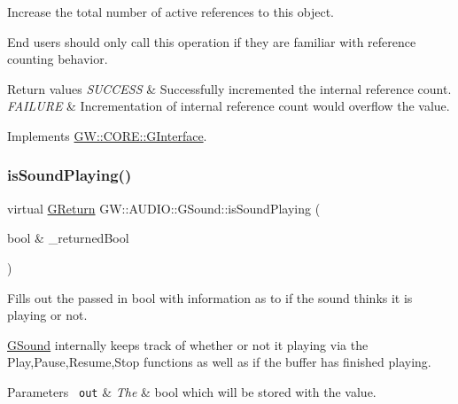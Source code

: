 Increase the total number of active references to this object. 

End users should only call this operation if they are familiar with reference counting behavior.


\begin{DoxyRetVals}{Return values}
{\em S\+U\+C\+C\+E\+SS} & Successfully incremented the internal reference count. \\
\hline
{\em F\+A\+I\+L\+U\+RE} & Incrementation of internal reference count would overflow the value. \\
\hline
\end{DoxyRetVals}


Implements \mbox{\hyperlink{classGW_1_1CORE_1_1GInterface_a2d710f20bb78e544e8309b5b75c21260}{G\+W\+::\+C\+O\+R\+E\+::\+G\+Interface}}.

\mbox{\label{classGW_1_1AUDIO_1_1GSound_a904241837e93254806b2518f7da24ba9}} 
\subsubsection{\texorpdfstring{isSoundPlaying()}{isSoundPlaying()}}
{\footnotesize\ttfamily virtual \mbox{\hyperlink{namespaceGW_a67a839e3df7ea8a5c5686613a7a3de21}{G\+Return}} G\+W\+::\+A\+U\+D\+I\+O\+::\+G\+Sound\+::is\+Sound\+Playing (\begin{DoxyParamCaption}\item[{bool \&}]{\+\_\+returned\+Bool }\end{DoxyParamCaption})\hspace{0.3cm}{\ttfamily [pure virtual]}}



Fills out the passed in bool with information as to if the sound thinks it is playing or not. 

\mbox{\hyperlink{classGW_1_1AUDIO_1_1GSound}{G\+Sound}} internally keeps track of whether or not it playing via the Play,Pause,Resume,Stop functions as well as if the buffer has finished playing.


\begin{DoxyParams}[1]{Parameters}
\mbox{\texttt{ out}}  & {\em The} & bool which will be stored with the value.\\
\hline
\end{DoxyParams}

